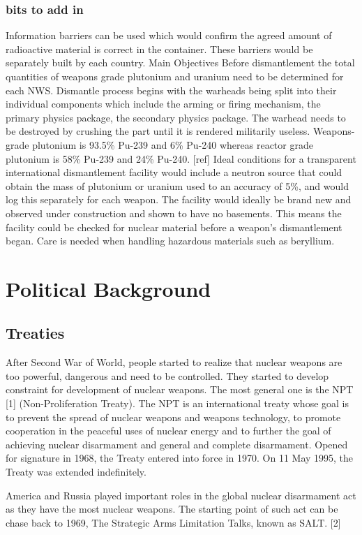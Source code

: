 \documentclass[twocolumn,a4paper]{article}
\begin{document}
\subsubsection{bits to add in}
Information barriers can be used which would confirm the agreed amount
of radioactive material is correct in the container. These barriers
would be separately built by each country.  Main Objectives Before
dismantlement the total quantities of weapons grade plutonium and
uranium need to be determined for each NWS.  Dismantle process begins
with the warheads being split into their individual components which
include the arming or firing mechanism, the primary physics package,
the secondary physics package.  The warhead needs to be destroyed by
crushing the part until it is rendered militarily useless.
Weapons-grade plutonium is 93.5\% Pu-239 and 6\% Pu-240 whereas
reactor grade plutonium is 58\% Pu-239 and 24\% Pu-240. [ref] Ideal
conditions for a transparent international dismantlement facility
would include a neutron source that could obtain the mass of plutonium
or uranium used to an accuracy of 5\%, and would log this separately
for each weapon.  The facility would ideally be brand new and observed
under construction and shown to have no basements. This means the
facility could be checked for nuclear material before a weapon’s
dismantlement began.  Care is needed when handling hazardous materials
such as beryllium.

\section{Political Background}
\subsection{Treaties}
After Second War of World, people started to realize that nuclear 
weapons are too powerful, dangerous and need to be controlled. They
started to develop constraint for development of nuclear weapons. 
The most general one is the NPT [1] (Non-Proliferation Treaty). The
NPT is an international treaty whose goal is to prevent the spread 
of nuclear weapons and weapons technology, to promote cooperation 
in the peaceful uses of nuclear energy and to further the goal of 
achieving nuclear disarmament and general and complete disarmament. 
Opened for signature in 1968, the Treaty entered into force in 1970. 
On 11 May 1995, the Treaty was extended indefinitely.

America and Russia played important roles in the global nuclear 
disarmament act as they have the most nuclear weapons. The starting 
point of such act can be chase back to 1969, The Strategic Arms 
Limitation Talks, known as SALT. [2]
\end{document}
